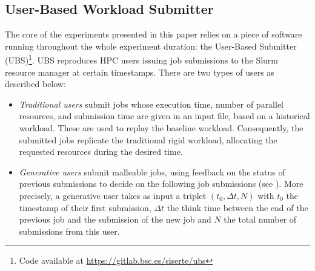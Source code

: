 \documentclass[a4paper,fleqn]{cas-dc}
\begin{document}

\subsection{User-Based Workload Submitter}
\label{subsec:submitter}

The core of the experiments presented in this paper relies on a piece of software running throughout the whole experiment duration: the User-Based Submitter (UBS)\footnote{Code available at \url{https://gitlab.bsc.es/siserte/ubs}}.%
UBS reproduces HPC users issuing job submissions to the Slurm resource manager at certain timestamps.
There are two types of users as described below:
\begin{itemize}[wide]
    \item \textit{Traditional users} submit jobs whose execution time, number of parallel resources, and submission time are given in an input file, based on a historical workload.
    These are used to replay the baseline workload.
    Consequently, the submitted jobs replicate the traditional rigid workload, allocating the requested resources during the desired time.

    \item \textit{Generative users} submit malleable jobs, using feedback on the status of previous submissions to decide on the following job submissions (see \cite{madon_replay_2024}).
    More precisely, a generative user takes as input a triplet $(t_0, \Delta t, N)$
    with $t_0$ the timestamp of their first submission,
    $\Delta t$ the think time between the end of the previous job and the submission of the new job and $N$ the total number of submissions from this user.
\end{itemize}
\end{document}
